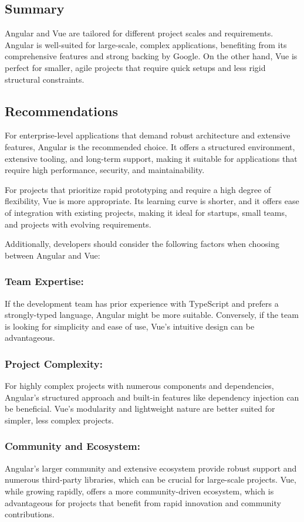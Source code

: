 \documentclass[conference]{IEEEtran}
\begin{document}
\subsection{Summary}
Angular and Vue are tailored for different project scales and requirements. Angular is well-suited for large-scale, complex applications, benefiting from its comprehensive features and strong backing by Google. On the other hand, Vue is perfect for smaller, agile projects that require quick setups and less rigid structural constraints.

\subsection{Recommendations}
For enterprise-level applications that demand robust architecture and extensive features, Angular is the recommended choice. It offers a structured environment, extensive tooling, and long-term support, making it suitable for applications that require high performance, security, and maintainability.

For projects that prioritize rapid prototyping and require a high degree of flexibility, Vue is more appropriate. Its learning curve is shorter, and it offers ease of integration with existing projects, making it ideal for startups, small teams, and projects with evolving requirements.

Additionally, developers should consider the following factors when choosing between Angular and Vue:
\newline
\subsubsection{Team Expertise:} If the development team has prior experience with TypeScript and prefers a strongly-typed language, Angular might be more suitable. Conversely, if the team is looking for simplicity and ease of use, Vue's intuitive design can be advantageous.
\newline\subsubsection{Project Complexity:} For highly complex projects with numerous components and dependencies, Angular’s structured approach and built-in features like dependency injection can be beneficial. Vue’s modularity and lightweight nature are better suited for simpler, less complex projects.
\newline\subsubsection{Community and Ecosystem:} Angular’s larger community and extensive ecosystem provide robust support and numerous third-party libraries, which can be crucial for large-scale projects. Vue, while growing rapidly, offers a more community-driven ecosystem, which is advantageous for projects that benefit from rapid innovation and community contributions.
\newline
\end{document}
